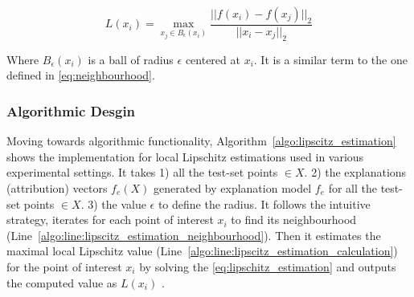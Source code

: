 \documentclass[english]{tktltiki2}
\theoremstyle{definition}
\theoremstyle{remark}
\begin{document}

\begin{equation}\label{eq:lipschitz_estimation}
L(x_i) = \operatorname*{max}_{x_j \in B_{\epsilon}(x_i)}  \frac{||f(x_i) - f(x_j)||_{2}}{||x_i - x_j||_{2}}
\end{equation}

Where $B_{\epsilon}(x_{i})$ is a ball of radius $\epsilon$ centered at $x_i$. It is a similar term to the one defined in \eqref{eq:neighbourhood}. 

\subsubsection{Algorithmic Desgin}\label{sec:algorithmic_desgin} %
Moving towards algorithmic functionality, Algorithm~\ref{algo:lipscitz_estimation} shows the implementation for local Lipschitz estimations used in various experimental settings. It takes 1) all the test-set points $ \in X$. 2) the explanations (attribution) vectors $f_e(X)$ generated by explanation model $f_e$  for all the test-set points $\in X$. 3) the value $\epsilon$ to define the radius. It follows the intuitive strategy, iterates for each point of interest $x_i$ to find its neighbourhood (Line~\ref{algo:line:lipscitz_estimation_neighbourhood}). Then it estimates the maximal local Lipschitz value (Line~\ref{algo:line:lipscitz_estimation_calculation}) for the point of interest $x_i$ by solving the \eqref{eq:lipschitz_estimation} and outputs the computed value as $L(x_i)$ .
\end{document}
